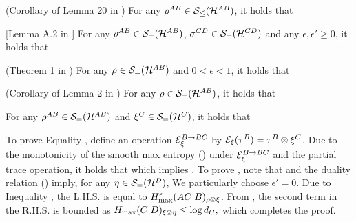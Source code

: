 \documentclass[journal]{IEEEtran}
\begin{document}
\begin{lmm}\label{lmm:SE2}
(Corollary of Lemma 20 in \cite{tomamichel2010duality})
For any $\rho^{AB}\in{\mathcal S}_\leq({\mathcal H}^{AB})$, it holds that
\elmm

\begin{lmm}\label{lmm:SE3}
[Lemma A.2 in \cite{DBWR2010}]
For any $\rho^{AB}\in{\mathcal S}_=({\mathcal H}^{AB})$, $\sigma^{CD}\in{\mathcal S}_=({\mathcal H}^{CD})$ and any $\epsilon,\epsilon'\geq0$, it holds that
\elmm



(Theorem 1 in \cite{tomamichel2009fully})
For any $\rho\in{\mathcal S}_=({\mathcal H}^{AB})$ and $0<\epsilon<1$, it holds that
\elmm

(Corollary of Lemma 2 in \cite{tomamichel2009fully})
For any $\rho\in{\mathcal S}_=({\mathcal H}^{AB})$, it holds that
\elmm


For any $\rho^{AB}\in{\mathcal S}_=({\mathcal H}^{AB})$ and $\xi^C\in{\mathcal S}_=({\mathcal H}^{C})$, it holds that
\elmm

\bprf
To prove Equality , define an operation ${\mathcal E}_\xi^{B\rightarrow BC}$ by ${\mathcal E}_\xi(\tau^B)=\tau^B\otimes\xi^C$.
Due to the monotonicity of the smooth max entropy () under ${\mathcal E}_\xi^{B\rightarrow BC}$ and the partial trace operation, it holds that
which implies .
To prove , note that  and the duality relation () imply, for any $\eta\in{\mathcal S}_=({\mathcal H}^D)$,
We particularly choose $\epsilon'=0$.
Due to Inequality , the L.H.S. is equal to $H_{\rm max}^{\epsilon}(AC|B)_{\rho\otimes\xi}$.
From , the second term in the R.H.S. is bounded as
$
H_{\rm max}(C|D)_{\xi\otimes\eta}
\leq
\log{d_C},
$
which completes the proof.
\QED
\eprf



\end{lmm}
\end{lmm}
\end{document}
